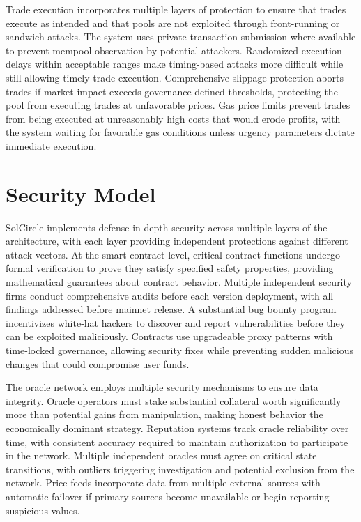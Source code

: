 \documentclass[11pt,a4paper]{article}
\begin{document}
Trade execution incorporates multiple layers of protection to ensure that trades execute as intended and that pools are not exploited through front-running or sandwich attacks. The system uses private transaction submission where available to prevent mempool observation by potential attackers. Randomized execution delays within acceptable ranges make timing-based attacks more difficult while still allowing timely trade execution. Comprehensive slippage protection aborts trades if market impact exceeds governance-defined thresholds, protecting the pool from executing trades at unfavorable prices. Gas price limits prevent trades from being executed at unreasonably high costs that would erode profits, with the system waiting for favorable gas conditions unless urgency parameters dictate immediate execution.

\section{Security Model}

SolCircle implements defense-in-depth security across multiple layers of the architecture, with each layer providing independent protections against different attack vectors. At the smart contract level, critical contract functions undergo formal verification to prove they satisfy specified safety properties, providing mathematical guarantees about contract behavior. Multiple independent security firms conduct comprehensive audits before each version deployment, with all findings addressed before mainnet release. A substantial bug bounty program incentivizes white-hat hackers to discover and report vulnerabilities before they can be exploited maliciously. Contracts use upgradeable proxy patterns with time-locked governance, allowing security fixes while preventing sudden malicious changes that could compromise user funds.

The oracle network employs multiple security mechanisms to ensure data integrity. Oracle operators must stake substantial collateral worth significantly more than potential gains from manipulation, making honest behavior the economically dominant strategy. Reputation systems track oracle reliability over time, with consistent accuracy required to maintain authorization to participate in the network. Multiple independent oracles must agree on critical state transitions, with outliers triggering investigation and potential exclusion from the network. Price feeds incorporate data from multiple external sources with automatic failover if primary sources become unavailable or begin reporting suspicious values.
\end{document}
